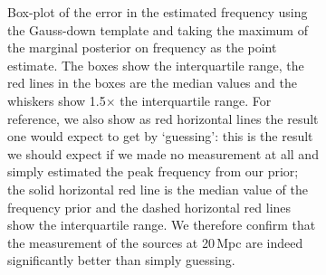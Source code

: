 \documentclass[showpacs, superscriptaddress, showpacs, letterpaper, showkeys,
preprintnumbers, altaffilletter, amssymb, amsmath, amsfonts, prd,
onecolumn, floatfix, nofootinbib]{revtex4-1}
\begin{document}
\begin{figure}
\begin{subfigure}{0.45\textwidth}
{}
\caption{Box-plot of the error in the estimated frequency using the Gauss-down
template and taking the maximum of the marginal posterior on frequency as the
point estimate.  The boxes show the interquartile range, the red lines in the
boxes are the median values and the whiskers show 1.5$\times$ the interquartile
range.  For reference, we also show as red horizontal lines the result one would
expect to get by `guessing': this is the result we should expect if we made no
measurement at all and simply estimated the peak frequency from our prior; the
solid horizontal red line is the median value of the frequency prior and the
dashed horizontal red lines show the interquartile range.  We therefore confirm
that the measurement of the sources at 20\,Mpc are indeed significantly better
than simply guessing.\label{fig:freqerr}}
\end{subfigure}
\begin{subfigure}{0.45\textwidth}
{}

\end{subfigure}
\end{figure}
\end{document}
